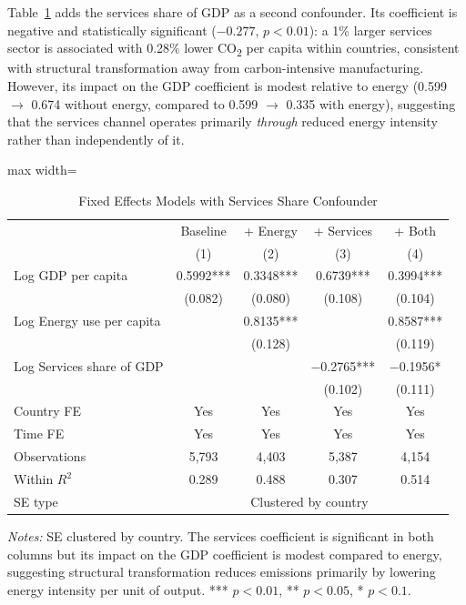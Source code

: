 \documentclass[12pt, a4paper]{article}
\begin{document}
Table~\ref{tab:services} adds the services share of GDP as a second confounder. Its coefficient is negative and statistically significant ($-0.277$, $p < 0.01$): a 1\% larger services sector is associated with 0.28\% lower CO\textsubscript{2} per capita within countries, consistent with structural transformation away from carbon-intensive manufacturing. However, its impact on the GDP coefficient is modest relative to energy (0.599 $\to$ 0.674 without energy, compared to 0.599 $\to$ 0.335 with energy), suggesting that the services channel operates primarily \emph{through} reduced energy intensity rather than independently of it.

\begin{table}[H]
\centering
\caption{Fixed Effects Models with Services Share Confounder}
\label{tab:services}
\begin{adjustbox}{max width=\textwidth}
\begin{threeparttable}
\small
\setlength{\tabcolsep}{6pt}
\begin{tabular}{lcccc}
\toprule
 & Baseline & + Energy & + Services & + Both \\
 & (1) & (2) & (3) & (4) \\
\midrule
Log GDP per capita
    & 0.5992*** & 0.3348*** & 0.6739*** & 0.3994*** \\
    & (0.082)   & (0.080)   & (0.108)   & (0.104)   \\[4pt]
Log Energy use per capita
    &           & 0.8135*** &           & 0.8587*** \\
    &           & (0.128)   &           & (0.119)   \\[4pt]
Log Services share of GDP
    &           &           & $-$0.2765*** & $-$0.1956* \\
    &           &           & (0.102)      & (0.111)   \\
\midrule
Country FE   & Yes   & Yes   & Yes   & Yes   \\
Time FE      & Yes   & Yes   & Yes   & Yes   \\
Observations & 5,793 & 4,403 & 5,387 & 4,154 \\
Within $R^2$ & 0.289 & 0.488 & 0.307 & 0.514 \\
SE type      & \multicolumn{4}{c}{Clustered by country} \\
\bottomrule
\end{tabular}
\begin{tablenotes}
\small
\item \textit{Notes:} SE clustered by country. The services coefficient is significant in both columns but its impact on the GDP coefficient is modest compared to energy, suggesting structural transformation reduces emissions primarily by lowering energy intensity per unit of output. *** $p<0.01$, ** $p<0.05$, * $p<0.1$.
\end{tablenotes}
\end{threeparttable}
\end{adjustbox}
\end{table}
\end{document}
